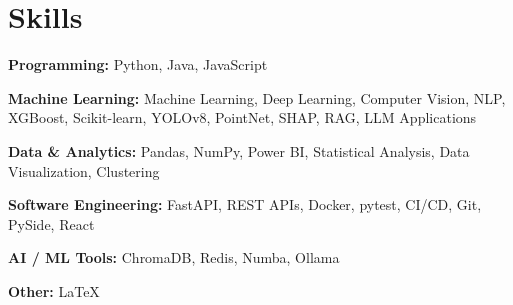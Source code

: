 \section*{Skills}

\textbf{Programming:}
Python, Java, JavaScript

\textbf{Machine Learning:}
Machine Learning, Deep Learning, Computer Vision, NLP, XGBoost,
Scikit-learn, YOLOv8, PointNet, SHAP, RAG, LLM Applications

\textbf{Data \& Analytics:}
Pandas, NumPy, Power BI, Statistical Analysis, Data Visualization,
Clustering

\textbf{Software Engineering:}
FastAPI, REST APIs, Docker, pytest, CI/CD, Git, PySide, React

\textbf{AI / ML Tools:}
ChromaDB, Redis, Numba, Ollama

\textbf{Other:}
LaTeX